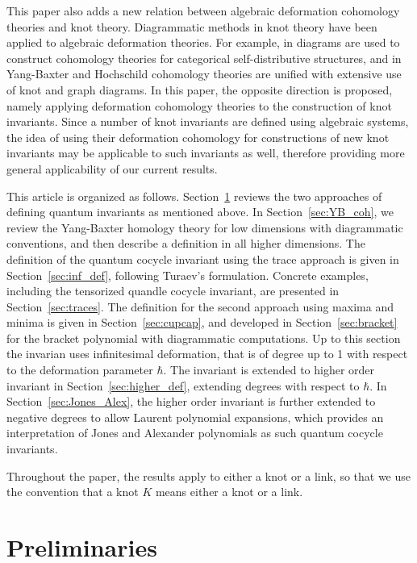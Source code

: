 \documentclass[11pt,fleqn]{amsart} %
\begin{document}
This paper also adds a new relation between algebraic deformation cohomology theories and knot theory.
Diagrammatic methods in knot theory have been applied to algebraic deformation theories. For example, 
in \cite{cat_SD} diagrams are used to construct cohomology theories for categorical self-distributive structures, and in \cite{SZ-YBH,SZ-BC} Yang-Baxter and Hochschild cohomology theories are unified with extensive use of knot and graph diagrams. In this paper, the opposite direction is proposed, namely applying deformation cohomology theories to the construction of knot invariants. Since a number of  knot invariants are defined using algebraic systems, the idea of using their deformation cohomology for constructions of new knot invariants 
may be applicable to such  invariants as well, therefore providing more general applicability of our current results.

This article is organized as follows. Section~\ref{sec:prelim} reviews the two approaches of defining quantum invariants as mentioned above.
In Section~\ref{sec:YB_coh}, 
we review  the  Yang-Baxter homology theory for  low dimensions with diagrammatic conventions,
and then describe a definition in  all higher dimensions.
The definition of the quantum cocycle invariant using the trace approach is given in Section~\ref{sec:inf_def}, following Turaev's formulation.
Concrete examples, including the tensorized quandle cocycle invariant, are presented in Section~\ref{sec:traces}.
The definition for the second approach using maxima and minima is given in Section~\ref{sec:cupcap}, and developed in Section~\ref{sec:bracket}
 for the bracket polynomial with diagrammatic computations.
Up to this section the invarian uses infinitesimal deformation, that is of degree up to 1 with respect to
the deformation parameter $\hbar$. 
The invariant is extended to higher order invariant in Section~\ref{sec:higher_def}, extending degrees with respect to $\hbar$.
In Section~\ref{sec:Jones_Alex}, the higher order invariant is further extended to negative degrees to allow Laurent polynomial expansions,
which provides an interpretation of Jones and Alexander polynomials as such quantum cocycle invariants.

Throughout the paper, the results apply to either a knot or a link, so that we use the convention that a knot $K$ means either a knot or a link. 




\section{Preliminaries}\label{sec:prelim}
\end{document}
